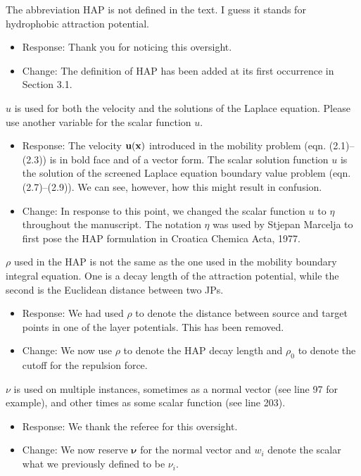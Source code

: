 \documentclass[11pt]{article}
\newcommand{\comment}[1]{{\color{blue} #1}}
\begin{document}
\noindent
\comment{The abbreviation HAP is not defined in the text. I guess it stands for hydrophobic attraction potential.
}
\begin{itemize}
  \item Response: Thank you for noticing this oversight. 
  \item Change: The definition of HAP has been added at its first occurrence in Section 3.1. 
\end{itemize}

\noindent
\comment{$u$ is used for both the velocity and the solutions of the
Laplace equation. Please use another variable for the scalar function
$u$.}
\begin{itemize}
\item Response: The velocity ${\bf u}({\bf x})$ introduced in the mobility problem (eqn. (2.1)--(2.3)) is in bold face and of a vector form. The scalar solution function $u$ is the solution of the screened Laplace equation boundary value problem (eqn. (2.7)--(2.9)).
  We can see, however, how this might result in confusion. 
\item Change: In response to this point, we changed the scalar function $u$ to $\eta$ throughout the manuscript.
  The notation $\eta$ was used by Stjepan Marcelja to first pose the HAP formulation
  in Croatica Chemica Acta, 1977.
\end{itemize}

\noindent
\comment{$\rho$ used in the HAP is not the same as the one used in the
mobility boundary integral equation. One is a decay length of the
attraction potential, while the second is the Euclidean distance between
two JPs.}
\begin{itemize}
  \item Response: We had used $\rho$ to denote the distance between source and
    target points in one of the layer potentials. This has been removed.

  \item Change: We now use $\rho$ to denote the HAP decay length and $\rho_0$ to
    denote the cutoff for the repulsion force.
\end{itemize}

\noindent
\comment{$\nu$ is used on multiple instances, sometimes as a normal
vector (see line 97 for example), and other times as some scalar
function (see line 203).}
\begin{itemize}
  \item Response: We thank the referee for this oversight.
  \item Change: We now reserve $\boldsymbol{\nu}$ for the normal vector and
    $w_i$ denote the scalar what we previously defined to be $\nu_i$.
\end{itemize}
\end{document}
